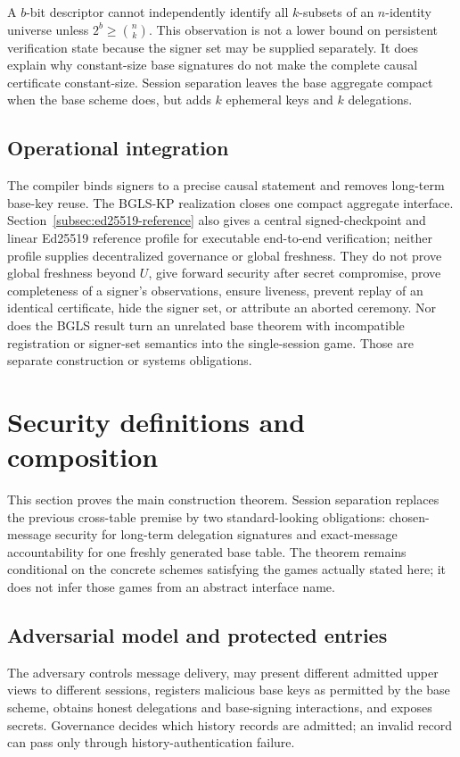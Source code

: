 \documentclass[11pt]{article}
\theoremstyle{definition}
\begin{document}
A $b$-bit descriptor cannot independently identify all $k$-subsets of an $n$-identity universe unless $2^b\geq\binom nk$.  This observation is not a lower bound on persistent verification state because the signer set may be supplied separately.  It does explain why constant-size base signatures do not make the complete causal certificate constant-size.  Session separation leaves the base aggregate compact when the base scheme does, but adds $k$ ephemeral keys and $k$ delegations.

\subsection{Operational integration}
The compiler binds signers to a precise causal statement and removes long-term base-key reuse.  The BGLS-KP realization closes one compact aggregate interface.  Section~\ref{subsec:ed25519-reference} also gives a central signed-checkpoint and linear Ed25519 reference profile for executable end-to-end verification; neither profile supplies decentralized governance or global freshness.  They do not prove global freshness beyond $U$, give forward security after secret compromise, prove completeness of a signer's observations, ensure liveness, prevent replay of an identical certificate, hide the signer set, or attribute an aborted ceremony.  Nor does the BGLS result turn an unrelated base theorem with incompatible registration or signer-set semantics into the single-session game.  Those are separate construction or systems obligations.

\section{Security definitions and composition}\label{sec:security}
This section proves the main construction theorem.  Session separation replaces the previous cross-table premise by two standard-looking obligations: chosen-message security for long-term delegation signatures and exact-message accountability for one freshly generated base table.  The theorem remains conditional on the concrete schemes satisfying the games actually stated here; it does not infer those games from an abstract interface name.

\subsection{Adversarial model and protected entries}
The adversary controls message delivery, may present different admitted upper views to different sessions, registers malicious base keys as permitted by the base scheme, obtains honest delegations and base-signing interactions, and exposes secrets.  Governance decides which history records are admitted; an invalid record can pass only through history-authentication failure.
\end{document}
